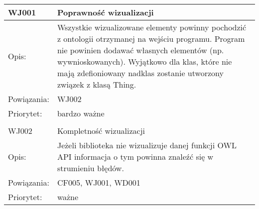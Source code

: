 \begin{center}

\begin{tabular}{|m{3cm}|m{9cm}|} \hline

WJ001 & Poprawność wizualizacji \\ \hline
Opis: & Wszystkie wizualizowane elementy powinny pochodzić z ontologii otrzymanej na wejściu programu. Program nie powinien dodawać własnych elementów (np. wywnioskowanych). Wyjątkowo dla klas, które nie mają zdefioniowany nadklas zostanie utworzony związek z klasą Thing. \\ \hline
Powiązania: & WJ002 \\ \hline
Priorytet: & bardzo ważne \\ \hline

\multicolumn{2}{c}{} \\
 \hline

WJ002 & Kompletność wizualizacji \\ \hline
Opis: & Jeżeli biblioteka nie wizualizuje danej funkcji OWL API informacja o tym powinna znaleźć się w strumieniu błędów. \\ \hline
Powiązania: & CF005, WJ001, WD001 \\ \hline
Priorytet: & ważne \\ \hline

\end{tabular}

\end{center}






